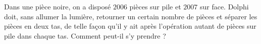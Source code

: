 Dans une pièce noire, on a disposé $2006$ pièces sur pile et $2007$ sur face. Dolphi doit, sans allumer la lumière, retourner un certain nombre de pièces et séparer les pièces en deux tas, de telle façon qu'il y ait après l'opération autant de pièces sur pile dans chaque tas. Comment peut-il s'y prendre ?
